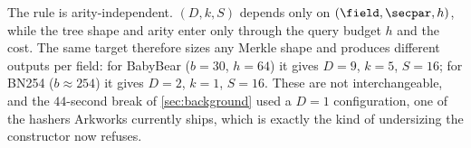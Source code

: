 The rule is arity-independent.  $(D,k,S)$ depends only on $(\field,\secpar,h)$,
while the tree shape and arity enter only through the query budget $h$ and the
cost.  The same target
therefore sizes any Merkle shape and produces different outputs per field: for
BabyBear ($b=30$, $h=64$) it gives $D=9$, $k=5$, $S=16$; for BN254
($b\approx254$) it gives $D=2$, $k=1$, $S=16$.  These are not interchangeable,
and the $44$-second break of \cref{sec:background} used a $D=1$ configuration,
one of the hashers \textsf{Arkworks} currently ships, which is exactly the kind
of undersizing the constructor now refuses.
